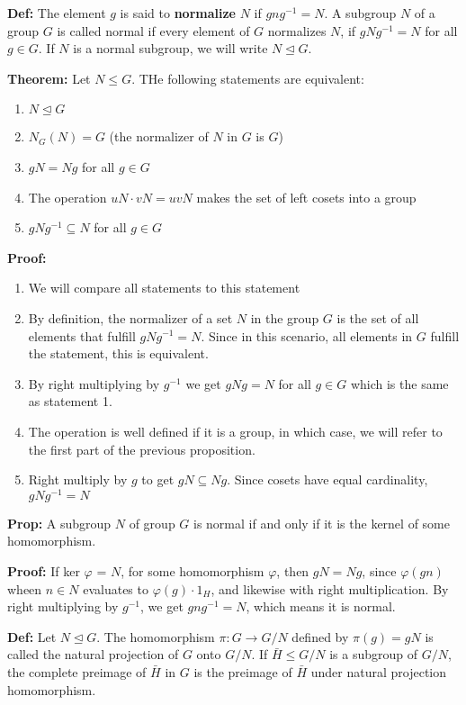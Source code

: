 \documentclass{article}
\begin{document}
\textbf{Def:} The element $g$ is said to \textbf{normalize} $N$ if $gng ^{-1} = N$. A subgroup $N$ of a group $G$ is called normal if every element of $G$ normalizes $N$, if $gNg ^{-1} = N$ for all $g \in G$. If $N$ is a normal subgroup, we will write $N \trianglelefteq G$. 

\textbf{Theorem:} Let $N \leq G$. THe following statements are equivalent:

\begin{enumerate}
    \item $N \trianglelefteq G$
    \item $N_G(N) = G$ (the normalizer of $N$ in $G$ is $G$)
    \item $gN = Ng$ for all $g \in G$
    \item The operation $uN \cdot vN = uvN$ makes the set of left cosets into a group
    \item $gNg ^{-1} \subseteq N$ for all $g \in G$
\end{enumerate}

\textbf{Proof:} 

\begin{enumerate}
    \item We will compare all statements to this statement
    \item By definition, the normalizer of a set $N$ in the group $G$ is the set of all elements that fulfill $gNg ^{-1} = N$. Since in this scenario, all elements in $G$ fulfill the statement, this is equivalent.
    \item By right multiplying by $g ^{-1}$ we get $gNg = N$ for all $g \in G$ which is the same as statement 1.
    \item The operation is well defined if it is a group, in which case, we will refer to the first part of the previous proposition.
    \item Right multiply by $g$ to get $gN \subseteq Ng$. Since cosets have equal cardinality, $gNg ^{-1} = N$
\end{enumerate}

\textbf{Prop:} A subgroup $N$ of group $G$ is normal if and only if it is the kernel of some homomorphism. 

\textbf{Proof:} If ker $\varphi$ = $N$, for some homomorphism $\varphi$, then $gN = Ng$, since $\varphi (gn)$ wheen $n \in N$ evaluates to $\varphi (g) \cdot 1_H$, and likewise with right multiplication. By right multiplying by $g ^{-1}$, we get $gng ^{-1} = N$, which means it is normal.

\textbf{Def:} Let $N \trianglelefteq G$. The homomorphism $\pi: G \rightarrow G/N$ defined by $\pi (g) = gN$ is called the natural projection of $G$ onto $G/N$. If $\bar{H} \leq G/N$ is a subgroup of $G/N$, the complete preimage of $\bar{H}$ in $G$ is the preimage of $\bar{H}$ under natural projection homomorphism.
\end{document}
